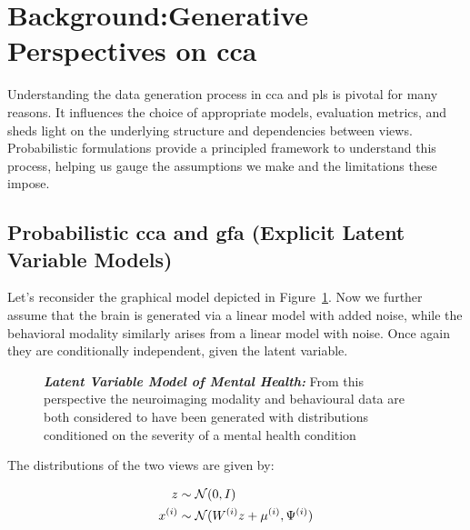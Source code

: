 \section{Background:Generative Perspectives on \acrshort{cca}}

Understanding the data generation process in \acrshort{cca} and \acrshort{pls} is pivotal for many reasons.
It influences the choice of appropriate models, evaluation metrics, and sheds light on the underlying structure and dependencies between views.
Probabilistic formulations provide a principled framework to understand this process, helping us gauge the assumptions we make and the limitations these impose.

\subsection{Probabilistic \acrshort{cca} and \acrshort{gfa} (Explicit Latent Variable Models)}\label{subsubsec:a-probabilistic-latent-variable-perspective}

Let's reconsider the graphical model depicted in Figure~\ref{fig:mentalhealthselfsupervisedrepeat}.
Now we further assume that the brain is generated via a linear model with added noise, while the behavioral modality similarly arises from a linear model with noise.
Once again they are conditionally independent, given the latent variable.

\begin{figure}
    \centering
    \caption[Latent Variable Model of Mental Health]{\textit{\textbf{Latent Variable Model of Mental Health:}} From this perspective the neuroimaging modality and behavioural data are both considered to have been generated with distributions conditioned on the severity of a mental health condition}\label{fig:mentalhealthselfsupervisedrepeat}
\end{figure}

The distributions of the two views are given by:

\begin{align}
    z& \sim \mathcal{N}(0, I)\\
    x^{(i)} & \sim \mathcal{N}(W^{(i)} z + \mu^{(i)}, \Psi^{(i)})
\end{align}

